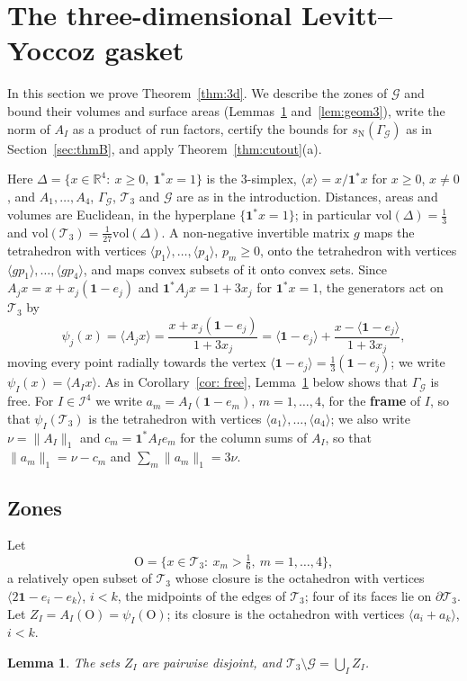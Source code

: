 \documentclass[11pt]{amsart}
\newtheorem{lemma}[proposition]{Lemma}
\theoremstyle{definition}
\theoremstyle{remark}
\newcommand{\one}{\mathbf 1}
\newcommand{\R}{\mathbb R}
\newcommand{\cI}{\mathcal I}
\newcommand{\cT}{\mathcal T}
\newcommand{\cG}{\mathcal G}
\newcommand{\GG}{\Gamma_{\mathcal G}}
\newcommand{\Oct}{\mathrm{O}}
\newcommand{\sN}{s_{\mathrm N}}
\newcommand{\norm}[1]{\lVert #1\rVert}
\newcommand{\pr}[1]{\langle #1\rangle}
\begin{document}
\section{The three-dimensional Levitt--Yoccoz gasket}\label{sec:3d}

In this section we prove Theorem~\ref{thm:3d}. We describe the zones of $\cG$ and bound their volumes and surface areas (Lemmas~\ref{lem:oct} and~\ref{lem:geom3}), write the norm of $A_I$ as a product of run factors, certify the bounds for $\sN(\GG)$ as in Section~\ref{sec:thmB}, and apply Theorem~\ref{thm:cutout}(a).

Here $\Delta=\{x\in\R^4:\ x\ge0,\ \one^*x=1\}$ is the $3$-simplex, $\pr x=x/\one^*x$ for $x\ge0$, $x\neq0$, and $A_1,\dots,A_4$, $\GG$, $\cT_3$ and $\cG$ are as in the introduction.
Distances, areas and volumes are Euclidean, in the hyperplane $\{\one^*x=1\}$; in particular $\mathrm{vol}(\Delta)=\frac13$ and $\mathrm{vol}(\cT_3)=\frac1{27}\mathrm{vol}(\Delta)$.
A non-negative invertible matrix $g$ maps the tetrahedron with vertices $\pr{p_1},\dots,\pr{p_4}$, $p_m\ge0$, onto the tetrahedron with vertices $\pr{gp_1},\dots,\pr{gp_4}$, and maps convex subsets of it onto convex sets.
Since $A_jx=x+x_j(\one-e_j)$ and $\one^*A_jx=1+3x_j$ for $\one^*x=1$, the generators act on $\cT_3$ by
\[
  \psi_j(x)=\pr{A_jx}=\frac{x+x_j(\one-e_j)}{1+3x_j}=\pr{\one-e_j}+\frac{x-\pr{\one-e_j}}{1+3x_j},
\]
moving every point radially towards the vertex $\pr{\one-e_j}=\frac13(\one-e_j)$; we write $\psi_I(x)=\pr{A_Ix}$.
As in Corollary~\ref{cor: free}, Lemma~\ref{lem:oct} below shows that $\GG$ is free.
For $I\in\cI^4$ we write $a_m=A_I(\one-e_m)$, $m=1,\dots,4$, for the \textbf{frame} of $I$, so that $\psi_I(\cT_3)$ is the tetrahedron with vertices $\pr{a_1},\dots,\pr{a_4}$; we also write $\nu=\|A_I\|_1$ and $c_m=\one^*A_Ie_m$ for the column sums of $A_I$, so that $\norm{a_m}_1=\nu-c_m$ and $\sum_m\norm{a_m}_1=3\nu$.

\subsection*{Zones}
Let
\[
  \Oct=\bigl\{x\in \cT_3:\ x_m>\tfrac16,\ m=1,\dots,4\bigr\},
\]
a relatively open subset of $\cT_3$ whose closure is the octahedron with vertices $\pr{2\one-e_i-e_k}$, $i<k$, the midpoints of the edges of $\cT_3$; four of its faces lie on $\partial \cT_3$. Let $Z_I=A_I(\Oct)=\psi_I(\Oct)$; its closure is the octahedron with vertices $\pr{a_i+a_k}$, $i<k$.

\begin{lemma}\label{lem:oct}
The sets $Z_I$ are pairwise disjoint, and $\cT_3\setminus\cG=\bigcup_IZ_I$.
\end{lemma}
\end{document}
